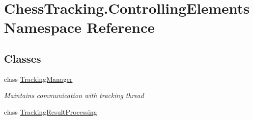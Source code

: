 \hypertarget{namespace_chess_tracking_1_1_controlling_elements}{}\section{Chess\+Tracking.\+Controlling\+Elements Namespace Reference}
\label{namespace_chess_tracking_1_1_controlling_elements}
\subsection*{Classes}
\begin{DoxyCompactItemize}
\item 
class \mbox{\hyperlink{class_chess_tracking_1_1_controlling_elements_1_1_tracking_manager}{Tracking\+Manager}}
\begin{DoxyCompactList}\small\item\em Maintains communication with tracking thread \end{DoxyCompactList}\item 
class \mbox{\hyperlink{class_chess_tracking_1_1_controlling_elements_1_1_tracking_result_processing}{Tracking\+Result\+Processing}}
\end{DoxyCompactItemize}

